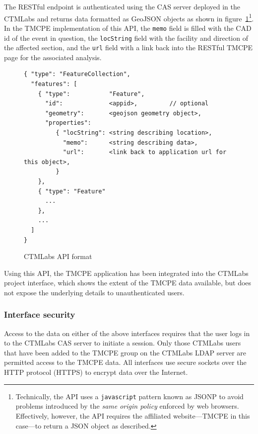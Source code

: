 \documentclass[12pt]{report}
\newcounter{space}
\begin{document}
The RESTful endpoint is authenticated using the \ac{CAS} server
deployed in the \ac{CTMLabs} and returns data formatted as
\ac{GeoJSON} objects \citep{butler08:_geojs_format_specif} as shown in
figure~\ref{fig:ctmlabs-api}\footnote{Technically, the \ac{API} uses a
  \texttt{javascript} pattern known as \ac{JSONP}
  \citep{özses09:_cross_jsonp_part} to avoid problems introduced by
  the \emph{same origin policy} enforced by web browsers.
  Effectively, however, the \ac{API} requires the affiliated
  website---\ac{TMCPE} in this case---to return a JSON object as
  described.}.  In the \ac{TMCPE} implementation of this \ac{API}, the
\texttt{memo} field is filled with the CAD id of the event in
question, the \texttt{locString} field with the facility and direction
of the affected section, and the \texttt{url} field with a link back
into the RESTful \ac{TMCPE} page for the associated analysis.
\begin{figure}[t]
  \centering
\begin{singlespace}
\begin{verbatim}
{ "type": "FeatureCollection",
  "features": [
    { "type":           "Feature",
      "id":             <appid>,         // optional
      "geometry":       <geojson geometry object>,
      "properties":    
         { "locString": <string describing location>,
           "memo":      <string describing data>,
           "url":       <link back to application url for this object>,
         }
    },
    { "type": "Feature"
      ...
    },
    ...
  ]
}
\end{verbatim}
\end{singlespace}
\caption{CTMLabs API format}
  \label{fig:ctmlabs-api}
\end{figure}

Using this \ac{API}, the \ac{TMCPE} application has been integrated into the
\ac{CTMLabs} project interface, which shows the extent of the \ac{TMCPE} data
available, but does not expose the underlying details to
unauthenticated users.

\subsubsection{Interface security}
\label{sec:interface-security}

Access to the data on either of the above interfaces requires that the
user logs in to the \ac{CTMLabs} \ac{CAS} server to initiate a
session.  Only those \ac{CTMLabs} users that have been added to the
\ac{TMCPE} group on the \ac{CTMLabs} \ac{LDAP} server are permitted
access to the \ac{TMCPE} data.  All interfaces use secure sockets over
the HTTP protocol (HTTPS) to encrypt data over the Internet.
\end{document}
